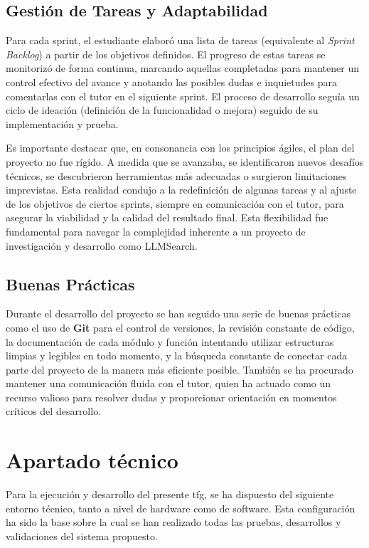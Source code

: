 \subsection{Gestión de Tareas y Adaptabilidad}
\label{subsec:gestion_tareas}

Para cada sprint, el estudiante elaboró una lista de tareas (equivalente al \textit{Sprint Backlog}) a partir de los objetivos definidos. El progreso de estas tareas se monitorizó de forma continua, marcando aquellas completadas para mantener un control efectivo del avance y anotando las posibles dudas e inquietudes para comentarlas con el tutor en el siguiente sprint. El proceso de desarrollo seguía un ciclo de ideación (definición de la funcionalidad o mejora) seguido de su implementación y prueba.

Es importante destacar que, en consonancia con los principios ágiles, el plan del proyecto no fue rígido. A medida que se avanzaba, se identificaron nuevos desafíos técnicos, se descubrieron herramientas más adecuadas o surgieron limitaciones imprevistas. Esta realidad condujo a la redefinición de algunas tareas y al ajuste de los objetivos de ciertos sprints, siempre en comunicación con el tutor, para asegurar la viabilidad y la calidad del resultado final. Esta flexibilidad fue fundamental para navegar la complejidad inherente a un proyecto de investigación y desarrollo como LLMSearch.

\subsection{Buenas Prácticas}
\label{subsec:buenas_practicas}
Durante el desarrollo del proyecto se han seguido una serie de buenas prácticas como el uso de \textbf{Git} para el control de versiones, la revisión constante de código, la documentación de cada módulo y función intentando utilizar estructuras limpias y legibles en todo momento, y la búsqueda constante de conectar cada parte del proyecto de la manera más eficiente posible. También se ha procurado mantener una comunicación fluida con el tutor, quien ha actuado como un recurso valioso para resolver dudas y proporcionar orientación en momentos críticos del desarrollo.


\section{Apartado técnico}
\label{sec:apartado_tecnico}

Para la ejecución y desarrollo del presente \gls{tfg}, se ha dispuesto del siguiente entorno técnico, tanto a nivel de hardware como de software. Esta configuración ha sido la base sobre la cual se han realizado todas las pruebas, desarrollos y validaciones del sistema propuesto.

